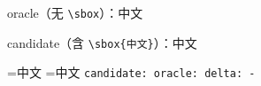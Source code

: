 \documentclass{article}
\begin{document}
oracle（无 \verb|\sbox|）：\quad 中文

candidate（含 \verb|\sbox{中文}|）：\quad 中文

\medskip
{}=\hbox{中文}
=\hbox{中文}
\texttt{candidate: \the{}\quad oracle: \the{}\quad delta: \the\dimexpr{}-\relax}
\end{document}
